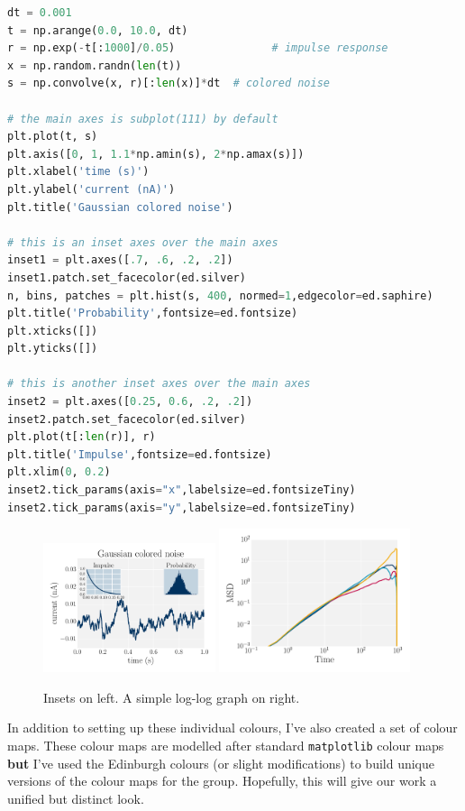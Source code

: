 \documentclass[10pt,a4paper]{article}
\begin{document}
\begin{lstlisting}[language=Python]
dt = 0.001
t = np.arange(0.0, 10.0, dt)
r = np.exp(-t[:1000]/0.05)               # impulse response
x = np.random.randn(len(t))
s = np.convolve(x, r)[:len(x)]*dt  # colored noise

# the main axes is subplot(111) by default
plt.plot(t, s)
plt.axis([0, 1, 1.1*np.amin(s), 2*np.amax(s)])
plt.xlabel('time (s)')
plt.ylabel('current (nA)')
plt.title('Gaussian colored noise')

# this is an inset axes over the main axes
inset1 = plt.axes([.7, .6, .2, .2])
inset1.patch.set_facecolor(ed.silver)
n, bins, patches = plt.hist(s, 400, normed=1,edgecolor=ed.saphire)
plt.title('Probability',fontsize=ed.fontsize)
plt.xticks([])
plt.yticks([])

# this is another inset axes over the main axes
inset2 = plt.axes([0.25, 0.6, .2, .2])
inset2.patch.set_facecolor(ed.silver)
plt.plot(t[:len(r)], r)
plt.title('Impulse',fontsize=ed.fontsize)
plt.xlim(0, 0.2)
inset2.tick_params(axis="x",labelsize=ed.fontsizeTiny)
inset2.tick_params(axis="y",labelsize=ed.fontsizeTiny)
\end{lstlisting}
\begin{figure}[h]
  \centering
  \includegraphics[width=0.45\textwidth]{insets.pdf}
  \includegraphics[width=0.5\textwidth]{loglog.pdf}
  \caption{Insets on left. A simple log-log graph on right.}
\end{figure}

In addition to setting up these individual colours, I've also created a set of colour maps. 
These colour maps are modelled after standard \texttt{matplotlib} colour maps \textbf{but} I've used the Edinburgh colours (or slight modifications) to build unique versions of the colour maps for the group. 
Hopefully, this will give our work a unified but distinct look. 
\end{document}
